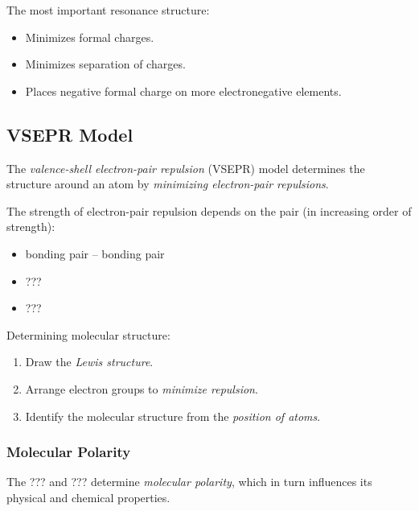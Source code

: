 The most important resonance structure:
\begin{itemize}
    \item Minimizes formal charges.
    \item Minimizes separation of charges.
    \item Places negative formal charge on more electronegative elements.
\end{itemize}


\subsection{VSEPR Model}
The \textit{valence-shell electron-pair repulsion} (VSEPR) model determines the structure
around an atom by \textit{minimizing electron-pair repulsions}.

The strength of electron-pair repulsion depends on the pair (in increasing order of strength):
\begin{itemize}
    \item bonding pair -- bonding pair
    \item ???
    \item ???
\end{itemize}

Determining molecular structure:
\begin{enumerate}
    \item Draw the \textit{Lewis structure}.
    \item Arrange electron groups to \textit{minimize repulsion}.
    \item Identify the molecular structure from the \textit{position of atoms}.
\end{enumerate}

\subsubsection{Molecular Polarity}
The ??? and ??? determine \textit{molecular polarity}, which in turn influences its physical and
chemical properties.